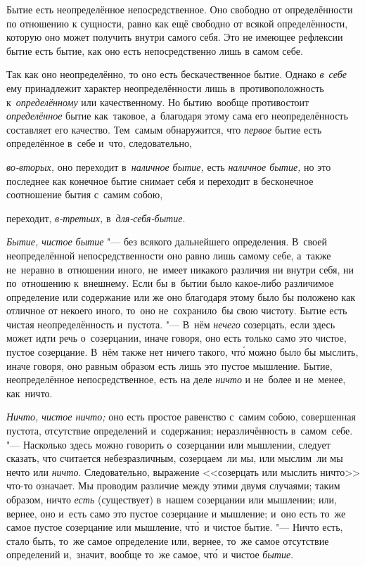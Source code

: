 Бытие есть неопределённое непосредственное. Оно свободно от определённости по
отношению к сущности, равно как ещё свободно от всякой определённости, которую
оно может получить внутри самого себя. Это не имеющее рефлексии бытие есть
бытие, как оно есть непосредственно лишь в самом себе.

Так как оно неопределённо, то оно есть бескачественное бытие. Однако
{\em в~себе} ему принадлежит характер неопределённости лишь в~противоположность
к~{\em определённому} или качественному. Но бытию~вообще противостоит
{\em определённое} бытие как~таковое, а~благодаря этому сама его
неопределённость составляет его качество. Тем~самым обнаружится, что
{\em первое} бытие есть определённое в~себе и~что, следовательно,

{\em во-вторых,} оно переходит в~{\em наличное бытие,} есть
{\em наличное бытие,} но это последнее как конечное бытие снимает себя
и переходит в бесконечное соотношение бытия с~самим собою,

переходит, {\em в-третьих,} в~{\em для-себя-бытие}.



{\em Бытие, чистое бытие} "--- без всякого дальнейшего определения.
В~своей неопределённой непосредственности оно равно лишь самому себе, а~также
не~неравно в~отношении иного, не~имеет никакого различия ни внутри себя, ни
по~отношению к~внешнему. Если бы в~бытии было какое-либо различимое определение
или содержание или же оно благодаря этому было бы положено как отличное от
некоего иного, то~оно не~сохранило~бы свою чистоту. Бытие есть чистая
неопределённость и~пустота. "--- В~нём {\em нечего} созерцать, если здесь может
идти речь о~созерцании, иначе говоря, оно есть только само это чистое, пустое
созерцание. В~нём также нет ничего такого, чт\'{о} можно было бы мыслить, иначе
говоря, оно равным образом есть лишь это пустое мышление. Бытие, неопределённое
непосредственное, есть на деле {\em ничто} и не~более и не~менее, как~ничто.


{\em Ничто, чистое ничто;} оно есть простое равенство с~самим собою,
совершенная пустота, отсутствие определений и~содержания; неразличённость
в~самом~себе. "--- Насколько здесь можно говорить о~созерцании или мышлении,
следует сказать, что считается небезразличным, созерцаем~ли мы, или мыслим~ли
мы нечто или {\em ничто}. Следовательно, выражение <<созерцать или мыслить ничто>>
что-то означает. Мы проводим различие между этими двумя
случаями; таким образом, ничто {\em есть} (существует) в~нашем созерцании или
мышлении; или, вернее, оно и~есть само это пустое созерцание и мышление; и~оно
есть то~же самое пустое созерцание или мышление, чт\'{о}~и чистое бытие. "---
Ничто есть, стало быть, то~же самое определение или, вернее, то~же самое
отсутствие определений и,~значит, вообще то~же самое,
чт\'{о}~и чистое {\em бытие}.

